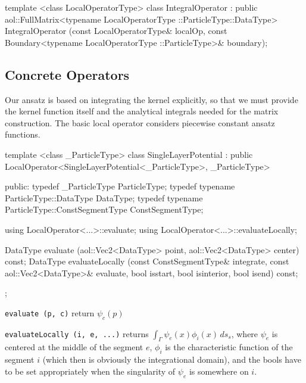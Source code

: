 \begin{myverbatim}
template <class LocalOperatorType>
  class IntegralOperator
  : public aol::FullMatrix<typename LocalOperatorType
                           ::ParticleType::DataType> {
  IntegralOperator (const LocalOperatorType& localOp,
                    const Boundary<typename LocalOperatorType
                                   ::ParticleType>& boundary);
}
\end{myverbatim}

\subsection {Concrete Operators}

Our ansatz is based on integrating the kernel explicitly, so that we must provide
the kernel function itself and the analytical integrals needed for the matrix construction.
The basic local operator considers piecewise constant ansatz functions.

\begin{myverbatim}
template <class _ParticleType>
  class SingleLayerPotential
  : public LocalOperator<SingleLayerPotential<_ParticleType>,
                         _ParticleType> {

  public:
    typedef _ParticleType ParticleType;
    typedef typename ParticleType::DataType DataType;
    typedef typename ParticleType::ConstSegmentType
                                   ConstSegmentType;

    using LocalOperator<...>::evaluate;
    using LocalOperator<...>::evaluateLocally;

    DataType evaluate (aol::Vec2<DataType> point,
                       aol::Vec2<DataType> center) const;
    DataType evaluateLocally (const ConstSegmentType& integrate,
                              const aol::Vec2<DataType>& evaluate,
                              bool isstart, bool isinterior, bool isend) const;
  };
\end{myverbatim}

\lstinline$evaluate (p, c)$ return $\psi_c(p)$

\lstinline$evaluateLocally (i, e, ...)$ returns $\int_\Gamma \psi_{e} (x) \phi_i (x) \, ds_s$, where $\psi_e$ is centered at the middle of the segment $e$,
$\phi_i$ is the characteristic function of the segment $i$ (which then is obviously the integrational domain), and the bools have to be set appropriately
when the singularity of $\psi_e$ is somewhere on $i$.



